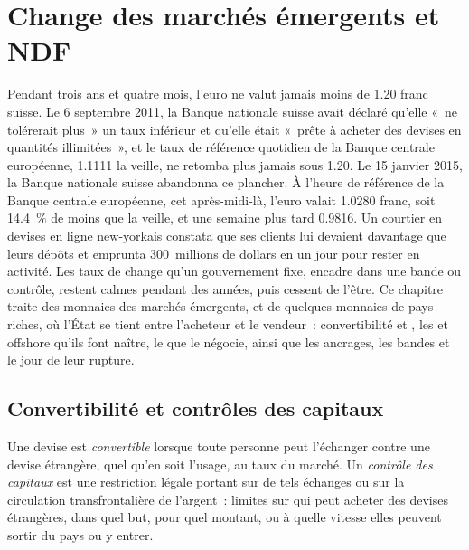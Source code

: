 \chapter{Change des marchés émergents et NDF}\label{ch:m2:emerging-market-fx-and-ndfs}

Pendant trois ans et quatre mois, l'euro ne valut jamais moins de 1.20 franc
suisse. Le 6 septembre 2011, la Banque nationale suisse avait déclaré
qu'elle «~ne tolérerait plus~» un taux inférieur et qu'elle était «~prête à acheter des devises en
quantités illimitées~», et le taux de référence quotidien de la Banque centrale européenne,
1.1111 la veille, ne retomba plus jamais sous 1.20. Le 15 janvier
2015, la Banque nationale suisse abandonna ce plancher. À l'heure de référence de la Banque centrale
européenne, cet après-midi-là, l'euro valait 1.0280 franc, soit 14.4~\%
de moins que la veille, et une semaine plus tard 0.9816. Un courtier en devises en ligne
new-yorkais constata que ses clients lui devaient davantage que leurs dépôts et emprunta
300~millions de dollars en un jour pour rester en activité. Les taux de change
qu'un gouvernement fixe, encadre dans une bande ou contrôle, restent calmes pendant des années, puis cessent de l'être.
Ce chapitre traite des monnaies des marchés émergents, et de quelques monnaies de pays riches,
où l'État se tient entre l'acheteur et le vendeur~: convertibilité
et , les  et offshore qu'ils font naître, le
 que le  négocie, ainsi que les ancrages, les bandes et le
jour de leur rupture.

\section{Convertibilité et contrôles des capitaux}

\begin{definition}\label{def:m2:emerging-market-fx-and-ndfs:controls}
Une devise est \emph{convertible} lorsque toute personne peut l'échanger
contre une devise étrangère, quel qu'en soit l'usage, au taux du marché. Un \emph{contrôle des
capitaux} est une restriction légale portant sur de tels échanges ou sur
la circulation transfrontalière de l'argent~: limites sur qui peut acheter des devises étrangères, dans
quel but, pour quel montant, ou à quelle vitesse elles peuvent sortir du pays ou y entrer.
\end{definition}

